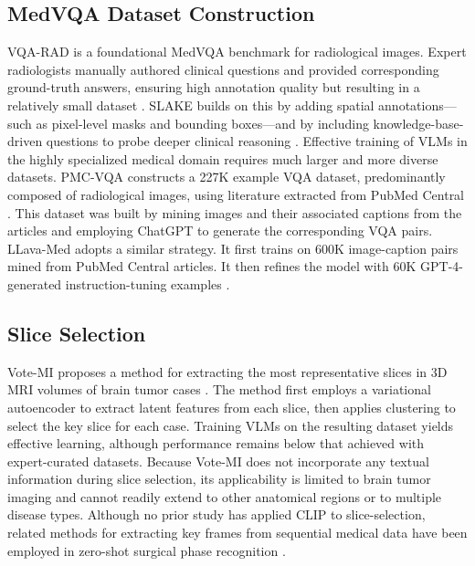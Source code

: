 \documentclass[bioengineering,article,submit,pdftex,moreauthors]{Definitions/mdpi}
\begin{document}
\subsection{MedVQA Dataset Construction}
VQA-RAD is a foundational MedVQA benchmark for radiological images. 
Expert radiologists manually authored clinical questions and provided corresponding ground-truth answers, ensuring high annotation quality but resulting in a relatively small dataset \cite{lau_dataset_2018}. 
SLAKE builds on this by adding spatial annotations—such as pixel-level masks and bounding boxes—and by including knowledge-base-driven questions to probe deeper clinical reasoning \cite{liu_slake_2021}.
Effective training of VLMs in the highly specialized medical domain requires much larger and more diverse datasets. 
PMC-VQA constructs a 227K example VQA dataset, predominantly composed of radiological images, using literature extracted from PubMed Central \cite{zhang_pmc-vqa_2024}.
This dataset was built by mining images and their associated captions from the articles and employing ChatGPT to generate the corresponding VQA pairs.
LLava-Med adopts a similar strategy. It first trains on 600K image-caption pairs mined from PubMed Central articles. 
It then refines the model with 60K GPT-4-generated instruction-tuning examples \cite{li_llava-med_2023}.


\subsection{Slice Selection}
Vote-MI proposes a method for extracting the most representative slices in 3D MRI volumes of brain tumor cases \cite{wang_enhancing_2024}. 
The method first employs a variational autoencoder to extract latent features from each slice, then applies clustering to select the key slice for each case. 
Training VLMs on the resulting dataset yields effective learning, although performance remains below that achieved with expert-curated datasets. 
Because Vote-MI does not incorporate any textual information during slice selection, its applicability is limited to brain tumor imaging and cannot readily extend to other anatomical regions or to multiple disease types.
Although no prior study has applied CLIP to slice-selection, related methods for extracting key frames from sequential medical data have been employed in zero-shot surgical phase recognition \cite{yuan_hecvl_2025}.


\end{document}
